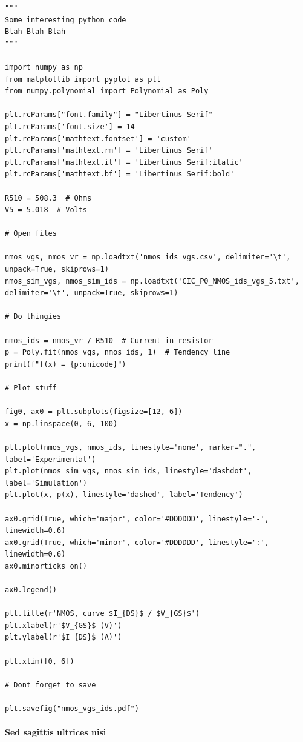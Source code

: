 \begin{lstlisting}[caption={Some Python Code \cite{esp32_devkit_reference_design}}, language=PythonPlus, style=ColorEX]
"""
Some interesting python code 
Blah Blah Blah
"""

import numpy as np
from matplotlib import pyplot as plt
from numpy.polynomial import Polynomial as Poly

plt.rcParams["font.family"] = "Libertinus Serif"
plt.rcParams['font.size'] = 14
plt.rcParams['mathtext.fontset'] = 'custom'
plt.rcParams['mathtext.rm'] = 'Libertinus Serif'
plt.rcParams['mathtext.it'] = 'Libertinus Serif:italic'
plt.rcParams['mathtext.bf'] = 'Libertinus Serif:bold'

R510 = 508.3  # Ohms
V5 = 5.018  # Volts

# Open files

nmos_vgs, nmos_vr = np.loadtxt('nmos_ids_vgs.csv', delimiter='\t', unpack=True, skiprows=1)
nmos_sim_vgs, nmos_sim_ids = np.loadtxt('CIC_P0_NMOS_ids_vgs_5.txt', delimiter='\t', unpack=True, skiprows=1)

# Do thingies

nmos_ids = nmos_vr / R510  # Current in resistor
p = Poly.fit(nmos_vgs, nmos_ids, 1)  # Tendency line
print(f"f(x) = {p:unicode}")

# Plot stuff

fig0, ax0 = plt.subplots(figsize=[12, 6])
x = np.linspace(0, 6, 100)

plt.plot(nmos_vgs, nmos_ids, linestyle='none', marker=".", label='Experimental')
plt.plot(nmos_sim_vgs, nmos_sim_ids, linestyle='dashdot', label='Simulation')
plt.plot(x, p(x), linestyle='dashed', label='Tendency')

ax0.grid(True, which='major', color='#DDDDDD', linestyle='-', linewidth=0.6)
ax0.grid(True, which='minor', color='#DDDDDD', linestyle=':', linewidth=0.6)
ax0.minorticks_on()

ax0.legend()

plt.title(r'NMOS, curve $I_{DS}$ / $V_{GS}$')
plt.xlabel(r'$V_{GS}$ (V)')
plt.ylabel(r'$I_{DS}$ (A)')

plt.xlim([0, 6])

# Dont forget to save

plt.savefig("nmos_vgs_ids.pdf")
\end{lstlisting}


\paragraph{Sed sagittis ultrices nisi}

